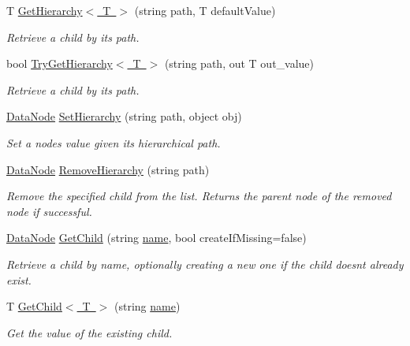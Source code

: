 \begin{DoxyCompactItemize}
T \mbox{\hyperlink{class_t_net_1_1_data_node_a4a906909adb289e2b6978033316dcff4}{Get\+Hierarchy$<$ T $>$}} (string path, T default\+Value)
\begin{DoxyCompactList}\small\item\em Retrieve a child by its path. \end{DoxyCompactList}\item 
bool \mbox{\hyperlink{class_t_net_1_1_data_node_ae42a7365cd1b0b11a3a9e93ab3002f7f}{Try\+Get\+Hierarchy$<$ T $>$}} (string path, out T out\+\_\+value)
\begin{DoxyCompactList}\small\item\em Retrieve a child by its path. \end{DoxyCompactList}\item 
\mbox{\hyperlink{class_t_net_1_1_data_node}{Data\+Node}} \mbox{\hyperlink{class_t_net_1_1_data_node_a2bc2cd72d6ab059e99cb792a5c21ee13}{Set\+Hierarchy}} (string path, object obj)
\begin{DoxyCompactList}\small\item\em Set a node\textquotesingle{}s value given its hierarchical path. \end{DoxyCompactList}\item 
\mbox{\hyperlink{class_t_net_1_1_data_node}{Data\+Node}} \mbox{\hyperlink{class_t_net_1_1_data_node_ae1cef396b65b5722575952647af4eaa7}{Remove\+Hierarchy}} (string path)
\begin{DoxyCompactList}\small\item\em Remove the specified child from the list. Returns the parent node of the removed node if successful. \end{DoxyCompactList}\item 
\mbox{\hyperlink{class_t_net_1_1_data_node}{Data\+Node}} \mbox{\hyperlink{class_t_net_1_1_data_node_aebf32646f6e54e2127ce51090549dd98}{Get\+Child}} (string \mbox{\hyperlink{class_t_net_1_1_data_node_aaf44a44fb25aad98dd115faf7607858c}{name}}, bool create\+If\+Missing=false)
\begin{DoxyCompactList}\small\item\em Retrieve a child by name, optionally creating a new one if the child doesn\textquotesingle{}t already exist. \end{DoxyCompactList}\item 
T \mbox{\hyperlink{class_t_net_1_1_data_node_ad48daa0909e1dbc05bd680735aec2d09}{Get\+Child$<$ T $>$}} (string \mbox{\hyperlink{class_t_net_1_1_data_node_aaf44a44fb25aad98dd115faf7607858c}{name}})
\begin{DoxyCompactList}\small\item\em Get the value of the existing child. \end{DoxyCompactList}\item 

\end{DoxyCompactItemize}
